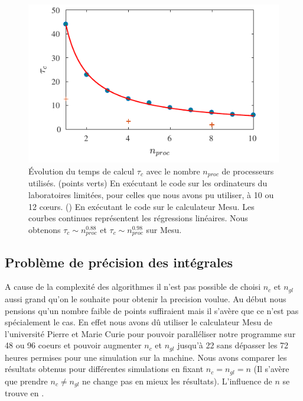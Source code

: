 \documentclass[10pt]{article}
\begin{document}
\begin{multicols}{2}
\begin{figure}[H]
\begin{center}
	\includegraphics[width=0.95\columnwidth]{Scalabilite.pdf}
\end{center}
\caption{Évolution du temps de calcul $\tau_c$ avec le nombre $n_{proc}$ de processeurs utilisés. (points verts) En exécutant le code sur les ordinateurs du laboratoires limitées, pour celles que nous avons pu utiliser, à 10 ou 12 cœurs. () En exécutant le code sur le calculateur Mesu. Les courbes continues représentent les régressions linéaires. Nous obtenons $\tau_c \sim n_{proc}^{0.88}$ et $\tau_c \sim n_{proc}^{0.98}$ sur Mesu. }
\label{fig:timeScal}
\end{figure}



\subsection{Problème de précision des intégrales}


A cause de la complexité des algorithmes il n'est pas possible de choisi $n_c$ et $n_{gl}$ aussi grand qu'on le souhaite pour obtenir la precision voulue. Au début nous pensions qu'un nombre faible de points suffiraient mais il s'avère que ce n'est pas spécialement le cas. En effet nous avons dû utiliser le calculateur Mesu \cite{} de l'université Pierre et Marie Curie pour pouvoir paralléliser notre programme sur 48 ou 96 coeurs et pouvoir augmenter $n_c$ et $n_{gl}$ jusqu'à 22 sans dépasser les 72 heures permises pour une simulation sur la machine. Nous avons comparer les résultats obtenus pour différentes simulations en fixant $n_c = n_{gl} = n$ (Il s'avère que prendre $n_c \neq n_{gl}$ ne change pas en mieux les résultats). L'influence de $n$ se trouve en .


\end{multicols}
\end{document}
